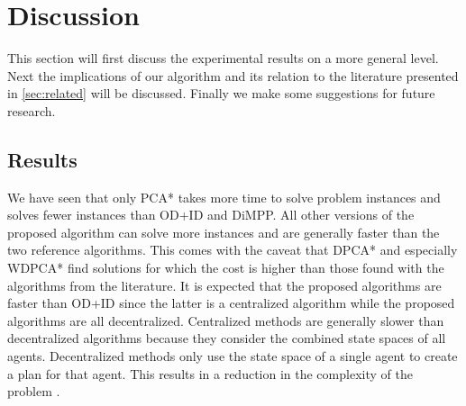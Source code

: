 \section{Discussion}\label{sec:discussion}
This section will first discuss the experimental results on a more general 
level. Next the implications of 
our algorithm and its relation to the literature presented in 
\autoref{sec:related} will be discussed. Finally we make some suggestions for 
future research.


\subsection{Results}

We have seen that only PCA* takes more time to solve problem instances and
solves fewer instances than OD+ID and DiMPP. All other versions of the proposed
algorithm can solve more
instances and are generally faster than the two reference algorithms. This
comes with the caveat that DPCA* and especially WDPCA* find solutions for which 
the cost is higher than those found with the algorithms from the literature. It 
is expected that the proposed algorithms are faster than OD+ID
since the latter is a centralized algorithm while the proposed algorithms are
all decentralized. Centralized methods are generally slower than decentralized
algorithms because they consider the combined state spaces
of all agents. Decentralized methods only use the state space of a single agent
to create a plan for that agent. This results in a reduction in the complexity
of the problem \cite{bennewitz2002,sharon2013}.

